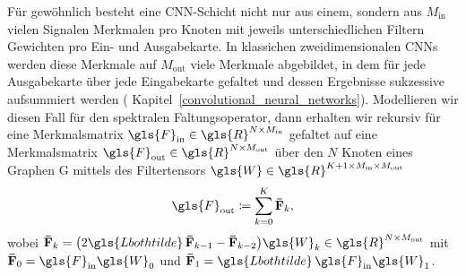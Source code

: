 Für gewöhnlich besteht eine \gls{CNN}-Schicht nicht nur aus einem, sondern aus $M_{\mathrm{in}}$ vielen Signalen \bzw{} Merkmalen pro Knoten mit jeweils unterschiedlichen Filtern \bzw{} Gewichten pro Ein- und Ausgabekarte.
In klassichen zweidimensionalen \glspl{CNN} werden diese Merkmale auf $M_{\mathrm{out}}$ viele Merkmale abgebildet, in dem für jede Ausgabekarte über jede Eingabekarte gefaltet und dessen Ergebnisse sukzessive aufsummiert werden (\vgl{} Kapitel~\ref{convolutional_neural_networks}).
Modellieren wir diesen Fall für den spektralen Faltungsoperator, dann erhalten wir rekursiv für eine Merkmalsmatrix $\gls{F}_{\mathrm{in}} \in \gls{R}^{N \times M_{\mathrm{in}}}$ gefaltet auf eine Merkmalsmatrix $\gls{F}_{\mathrm{out}} \in \gls{R}^{N \times M_{\mathrm{out}}}$ über den $N$ Knoten eines Graphen \gls{G} mittels des Filtertensors $\gls{W} \in \gls{R}^{K+1 \times M_{\mathrm{in}} \times M_{\mathrm{out}}}$
\begin{equation*}
  \gls{F}_{\mathrm{out}} \coloneqq \sum_{k=0}^K \ma{\bar F}_k,
\end{equation*}
wobei $\ma{\bar F}_k = \left(2\gls{Lbothtilde}\,\ma{\bar F}_{k -1} -  \ma{\bar F}_{k - 2}\right)\gls{W}_k \in \gls{R}^{N \times M_{\mathrm{out}}}$ mit $\ma{\bar F}_0 = \gls{F}_{\mathrm{in}}\gls{W}_0$ und $\ma{\bar F}_1 = \gls{Lbothtilde}\,\gls{F}_{\mathrm{in}}\gls{W}_1$.
